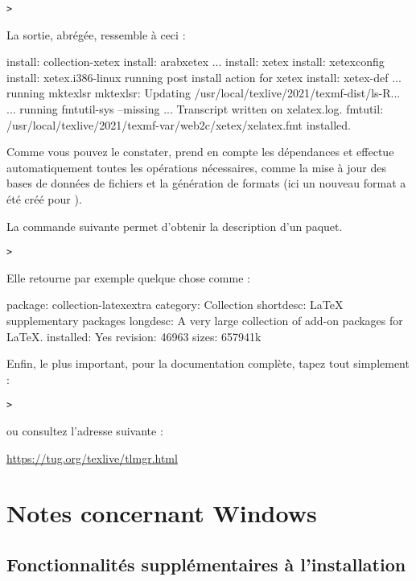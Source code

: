 \documentclass[german, english, french]{article}
\begin{document}
\begin{alltt}
> 
\end{alltt}
La sortie, abrégée, ressemble à ceci :
\begin{fverbatim}
install: collection-xetex
install: arabxetex
...
install: xetex
install: xetexconfig
install: xetex.i386-linux
running post install action for xetex
install: xetex-def
...
running mktexlsr
mktexlsr: Updating /usr/local/texlive/2021/texmf-dist/ls-R...
...
running fmtutil-sys --missing
...
Transcript written on xelatex.log.
fmtutil: /usr/local/texlive/2021/texmf-var/web2c/xetex/xelatex.fmt installed.
\end{fverbatim}
Comme vous pouvez le constater,  prend en compte les dépendances et
effectue automatiquement toutes les opérations nécessaires, comme la mise à jour
des bases de données de fichiers et la génération de formats (ici un nouveau
format a été créé pour \XeTeX).

La commande suivante permet d'obtenir la description d'un paquet.
\begin{alltt}
> 
\end{alltt}
Elle retourne par exemple quelque chose comme :
\begin{fverbatim}
package:    collection-latexextra
category:   Collection
shortdesc:  LaTeX supplementary packages
longdesc:   A very large collection of add-on packages for LaTeX.
installed:  Yes
revision:   46963
sizes:	    657941k
\end{fverbatim}

Enfin, le plus important, pour la documentation complète, tapez tout
simplement :
\begin{alltt}
> 
\end{alltt}
ou consultez l'adresse suivante :

\url{https://tug.org/texlive/tlmgr.html}

\section{Notes concernant Windows}
\label{sec:windows}

\subsection{Fonctionnalités supplémentaires à l'installation}
\label{sec:winfeatures}
\end{document}
